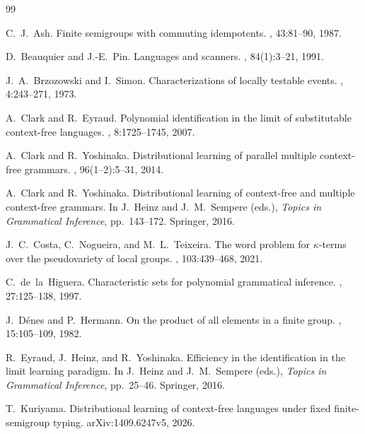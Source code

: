 \documentclass[11pt]{article}
\numberwithin{equation}{section}
\theoremstyle{plain}
\theoremstyle{definition}
\theoremstyle{remark}
\theoremstyle{plain}
\begin{document}
\begin{thebibliography}{99}

C.~J.~Ash.
\newblock Finite semigroups with commuting idempotents.
,
43:81--90, 1987.

D.~Beauquier and J.-E.~Pin.
\newblock Languages and scanners.
, 84(1):3--21, 1991.

J.~A.~Brzozowski and I.~Simon.
\newblock Characterizations of locally testable events.
, 4:243--271, 1973.

A.~Clark and R.~Eyraud.
\newblock Polynomial identification in the limit of substitutable context-free
languages.
, 8:1725--1745, 2007.

A.~Clark and R.~Yoshinaka.
\newblock Distributional learning of parallel multiple context-free grammars.
, 96(1--2):5--31, 2014.

A.~Clark and R.~Yoshinaka.
\newblock Distributional learning of context-free and multiple context-free
grammars.
\newblock In J.~Heinz and J.~M.~Sempere (eds.), {\em Topics in Grammatical
Inference}, pp.~143--172. Springer, 2016.

J.~C.~Costa, C.~Nogueira, and M.~L.~Teixeira.
\newblock The word problem for $\kappa$-terms over the pseudovariety of local
groups.
, 103:439--468, 2021.

C.~de~la~Higuera.
\newblock Characteristic sets for polynomial grammatical inference.
, 27:125--138, 1997.

J.~D\'enes and P.~Hermann.
\newblock On the product of all elements in a finite group.
, 15:105--109, 1982.

R.~Eyraud, J.~Heinz, and R.~Yoshinaka.
\newblock Efficiency in the identification in the limit learning paradigm.
\newblock In J.~Heinz and J.~M.~Sempere (eds.), {\em Topics in Grammatical
Inference}, pp.~25--46. Springer, 2016.

T.~Kuriyama.
\newblock Distributional learning of context-free languages under fixed
finite-semigroup typing.
\newblock arXiv:1409.6247v5, 2026.


\end{thebibliography}
\end{document}
